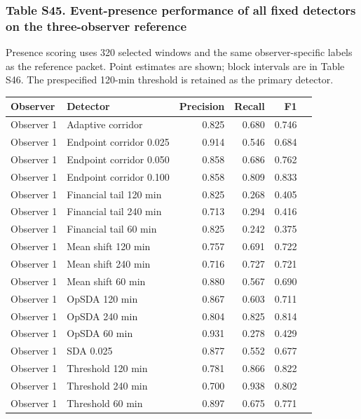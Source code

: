 \documentclass[a4paper,11pt]{article}
\newcounter{none}
\begin{document}
\subsubsection{Table S45. Event-presence performance of all fixed detectors on the three-observer reference}\label{table-s45.-event-presence-performance-of-all-fixed-detectors-on-the-three-observer-reference}

Presence scoring uses 320 selected windows and the same observer-specific labels as the reference packet. Point estimates are shown; block intervals are in Table S46. The prespecified 120-min threshold is retained as the primary detector.

{\def\LTcaptype{none} %
\begin{longtable}[]{@{}llrrrl@{}}
\toprule\noalign{}
Observer & Detector & Precision & Recall & F1 & \\
\midrule\noalign{}
\endhead
\bottomrule\noalign{}
\endlastfoot
Observer 1 & Adaptive corridor & 0.825 & 0.680 & 0.746 & \\
Observer 1 & Endpoint corridor 0.025 & 0.914 & 0.546 & 0.684 & \\
Observer 1 & Endpoint corridor 0.050 & 0.858 & 0.686 & 0.762 & \\
Observer 1 & Endpoint corridor 0.100 & 0.858 & 0.809 & 0.833 & \\
Observer 1 & Financial tail 120 min & 0.825 & 0.268 & 0.405 & \\
Observer 1 & Financial tail 240 min & 0.713 & 0.294 & 0.416 & \\
Observer 1 & Financial tail 60 min & 0.825 & 0.242 & 0.375 & \\
Observer 1 & Mean shift 120 min & 0.757 & 0.691 & 0.722 & \\
Observer 1 & Mean shift 240 min & 0.716 & 0.727 & 0.721 & \\
Observer 1 & Mean shift 60 min & 0.880 & 0.567 & 0.690 & \\
Observer 1 & OpSDA 120 min & 0.867 & 0.603 & 0.711 & \\
Observer 1 & OpSDA 240 min & 0.804 & 0.825 & 0.814 & \\
Observer 1 & OpSDA 60 min & 0.931 & 0.278 & 0.429 & \\
Observer 1 & SDA 0.025 & 0.877 & 0.552 & 0.677 & \\
Observer 1 & Threshold 120 min & 0.781 & 0.866 & 0.822 & \\
Observer 1 & Threshold 240 min & 0.700 & 0.938 & 0.802 & \\
Observer 1 & Threshold 60 min & 0.897 & 0.675 & 0.771 & \\

\end{longtable}}
\end{document}
